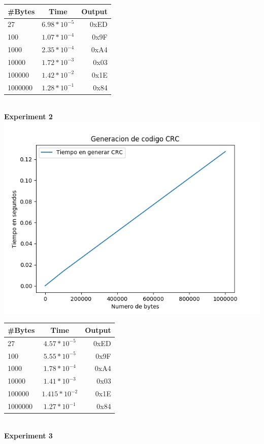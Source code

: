 \documentclass[10pt,twocolumn,letterpaper]{article}
\begin{document}
\begin{tabular}{ l | c | r }
  \hline			
  \#Bytes & Time & Output \\ \hline
  27 & $6.98*10^{-5}$ & 0xED \\
  100 & $1.07*10^{-4}$ & 0x9F \\
  1000 & $2.35*10^{-4}$ & 0xA4 \\
  10000 & $1.72*10^{-3}$ & 0x03 \\
  100000 & $1.42*10^{-2}$ & 0x1E \\
  1000000 & $1.28*10^{-1}$ & 0x84 \\
  \hline  
\end{tabular}\\
\textbf{Experiment 2}\\
\includegraphics[scale=0.4]{figura2.png} \\
\begin{tabular}{ l | c | r }
  \hline			
  \#Bytes & Time & Output \\ \hline
  27 & $4.57*10^{-5}$ & 0xED \\
  100 & $5.55*10^{-5}$ & 0x9F \\
  1000 & $1.78*10^{-4}$ & 0xA4 \\
  10000 & $1.41*10^{-3}$ & 0x03 \\
  100000 & $1.415*10^{-2}$ & 0x1E \\
  1000000 & $1.27*10^{-1}$ & 0x84 \\
  \hline  
\end{tabular}\\
\textbf{Experiment 3}\\
\end{document}
